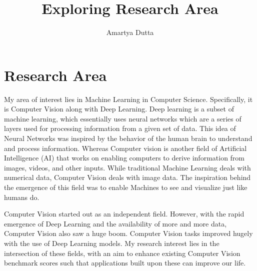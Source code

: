 \documentclass[11pt]{article}
\title{\textbf{Exploring Research Area}}
\author{Amartya Dutta}
\date{}
\begin{document}
\clearpage\maketitle
\thispagestyle{empty}

\section{Research Area}
My area of interest lies in Machine Learning in Computer Science. Specifically, it is Computer Vision along with Deep Learning. Deep learning is a subset of machine learning, which essentially uses neural networks which are a series of layers used for processing information from a given set of data. This idea of Neural Networks was inspired by the behavior of the human brain to understand and process information. Whereas Computer vision is another field of Artificial Intelligence (AI) that works on enabling computers to derive information from images, videos, and other inputs. While traditional Machine Learning deals with numerical data, Computer Vision deals with image data. The inspiration behind the emergence of this field was to enable Machines to see and visualize just like humans do. \par 
Computer Vision started out as an independent field. However, with the rapid emergence of Deep Learning and the availability of more and more data, Computer Vision also saw a huge boom. Computer Vision tasks improved hugely with the use of Deep Learning models. My research interest lies in the intersection of these fields, with an aim to enhance existing Computer Vision benchmark scores such that applications built upon these can improve our life. 
\end{document}
